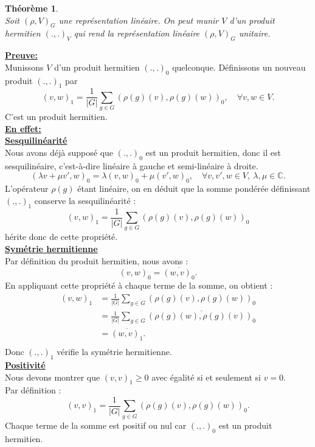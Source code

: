 \documentclass[a4paper, 14pt]{report}
\newtheorem{theorem}{Théorème}[section]
\begin{document}
\begin{onehalfspace}
{\begin{theorem} \cite{renard2009groupes}\\
Soit \( (\rho, V)_{G}\) une représentation linéaire. On peut munir \( V \) d’un produit hermitien \( (.,.)_V \) qui rend la représentation linéaire \( (\rho, V)_{G}\) unitaire.\\
\end{theorem}

\textbf{\underline{Preuve:}}  \\
Munissons \( V \) d’un produit hermitien \( (.,.)_0 \) quelconque. Définissons un nouveau produit  \( (.,.)_1 \)  par  
\[
(v, w)_1 = \frac{1}{|G|} \sum_{g \in G} (\rho(g) (v), \rho(g) (w))_0, \quad \forall v, w \in V.
\]
C'est un produit hermitien.\\
\textbf{\underline{En effet:}}\\ 
\textbf{\underline{Sesquilinéarité}}\\   
Nous avons déjà supposé que \( (.,.)_0 \) est un produit hermitien, donc il est sesquilinéaire, c'est-à-dire linéaire à gauche et semi-linéaire à droite. 
\[
(\lambda v + \mu v', w)_0 = \lambda (v, w)_0 + \mu (v', w)_0, \quad \forall v, v', w \in V, \ \lambda, \mu \in \mathbb{C}.
\]
L'opérateur \( \rho(g) \) étant linéaire, on en déduit que la somme pondérée définissant \( (.,.)_1 \) conserve la sesquilinéarité :  
\[
(v, w)_1 = \frac{1}{|G|} \sum_{g \in G} (\rho(g) (v), \rho(g) (w))_0
\]
hérite donc de cette propriété.\\
\textbf{\underline{Symétrie hermitienne}}\\  
Par définition du produit hermitien, nous avons :  
\[
(v, w)_0 = \overline{(w, v)_0}.
\]
En appliquant cette propriété à chaque terme de la somme, on obtient :
\begin{align*}
	(v, w)_1 
	&= \frac{1}{|G|} \sum_{g \in G} (\rho(g) (v), \rho(g) (w))_0 \\
	&= \frac{1}{|G|} \sum_{g \in G} \overline{(\rho(g) (w), \rho(g) (v))_0} \\
	&= \overline{(w, v)_1}. \\
\end{align*}
Donc \( (.,.)_1 \) vérifie la symétrie hermitienne.\\
\textbf{\underline{Positivité }}\\  
Nous devons montrer que \( (v, v)_1 \geq 0 \) avec égalité si et seulement si \( v = 0 \).\\
Par définition :
\[
(v, v)_1 = \frac{1}{|G|} \sum_{g \in G} (\rho(g) (v), \rho(g) (w))_0.
\]
Chaque terme de la somme est positif ou nul car \( (.,.)_0 \) est un produit hermitien.\\
}
\end{onehalfspace}
\end{document}
